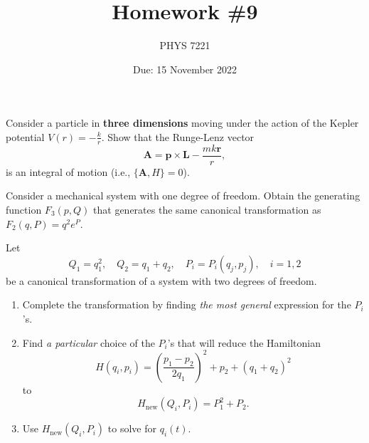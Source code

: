 \documentclass{jhwhw}
\author{PHYS 7221}
\title{Homework \#9}
\date{Due: 15 November 2022}
\begin{document}

Consider a particle in \textbf{three dimensions} moving under the action of the Kepler potential $V(r)=-\frac kr$.
Show that the Runge-Lenz vector
\begin{equation}
  \label{eq:1}
  \mathbf A = \mathbf p \times \mathbf L - \frac{m k \mathbf r}{r},
\end{equation}
is an integral of motion (i.e., $\{ \mathbf A, H\} = 0$).


Consider a mechanical system with one degree of freedom.
Obtain the generating function $F_{3}(p,Q)$ that generates the same canonical transformation as $F_{2}(q,P)= q^{2} e^{P}$.


Let
\begin{equation}
  \label{eq:2}
  Q_{1} = q_{1}^{2}, \quad Q_{2} = q_{1} + q_{2}, \quad P_{i} = P_{i}(q_{j},p_{j}), \quad i=1,2
\end{equation}
be a canonical transformation of a system with two degrees of freedom.
\begin{enumerate}
  \item Complete the transformation by finding \emph{the most general} expression for the $P_{i}$'s.
  \item Find \emph{a particular} choice of the $P_{i}$'s that will reduce the Hamiltonian
        \begin{equation}
          \label{eq:3}
          H(q_{i},p_{i}) = \left(\frac{p_{1}-p_{2}}{2q_{1}}\right)^{2} + p_{2} + (q_{1} + q_{2})^{2}
        \end{equation}
        to
        \begin{equation}
          \label{eq:4}
         H_{\mathrm{new}}(Q_{i},P_{i}) = P_{1}^{2} + P_{2}.
        \end{equation}
  \item Use $H_{\mathrm{new}}(Q_{i},P_{i})$ to solve for $q_i(t)$.
\end{enumerate}
\end{document}
